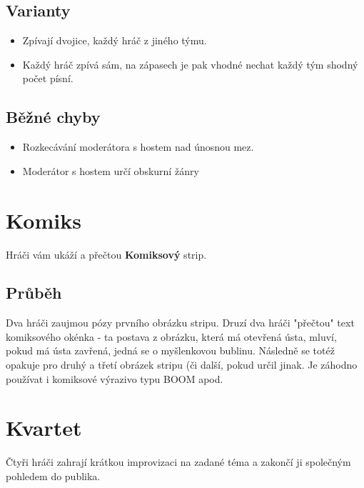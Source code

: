 \subsection{ Varianty } \begin{itemize}
\item Zpívají dvojice, každý hráč z jiného týmu.
\item Každý hráč zpívá sám, na zápasech je pak vhodné nechat každý tým shodný počet písní.
\end{itemize}
  
 
\subsection{ Běžné chyby } \begin{itemize}
\item Rozkecávání moderátora s hostem nad únosnou mez.
\item Moderátor s hostem určí obskurní žánry
\end{itemize}
 
 
 
 
 
\needspace{5cm} \section{Komiks} \label{komiks}  
 
Hráči vám ukáží a přečtou \textbf{Komiksový}{} strip. 
 
\subsection{Průběh} Dva hráči zaujmou pózy prvního obrázku stripu. 
Druzí dva hráči "přečtou"{} text komiksového okénka - ta postava z obrázku, která má otevřená ústa, mluví, pokud má ústa zavřená, jedná se o myšlenkovou bublinu. 
Následně se totéž opakuje pro druhý a třetí obrázek stripu (či další, pokud  určil jinak. 
Je záhodno používat i komiksové výrazivo typu BOOM apod. 
 
 
 
 
\needspace{5cm} \section{Kvartet} \label{kvartet}  
 
 
Čtyři hráči zahrají krátkou improvizaci na zadané téma a zakončí ji společným pohledem do publika. 
 
